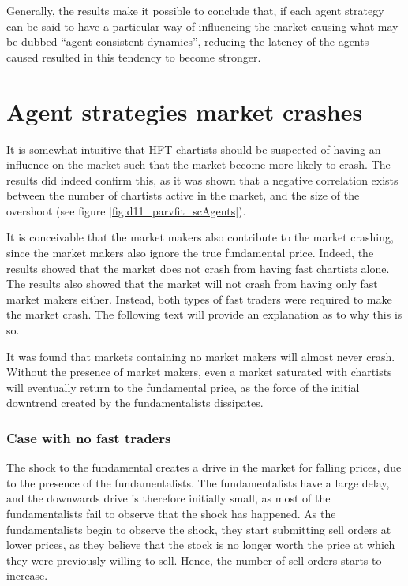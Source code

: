 Generally, the results make it possible to conclude that, if each agent strategy can be said to have a particular way of influencing the market causing what may be dubbed ``agent consistent dynamics'', reducing the latency of the agents caused  resulted in this tendency to become stronger.



\section{Agent strategies market crashes}


It is somewhat intuitive that HFT chartists should be suspected of having an influence on the market such that the market become more likely to crash. The results did indeed confirm this, as it was shown that a negative correlation exists between the number of chartists active in the market, and the size of the overshoot (see figure \ref{fig:d11_parvfit_scAgents}). 

It is conceivable that the market makers also contribute to the market crashing, since the market makers also ignore the true fundamental price. Indeed, the results showed that the market does not crash from having fast chartists alone. The results also showed that the market will not crash from having only fast market makers either. Instead, both types of fast traders were required to make the market crash. The following text will provide an explanation as to why this is so.

It was found that markets containing no market makers will almost never crash. Without the presence of market makers, even a market saturated with chartists will eventually return to the fundamental price, as the force of the initial downtrend created by the fundamentalists dissipates. 


\subsubsection*{Case with no fast traders}
The shock to the fundamental creates a drive in the market for falling prices, due to the presence of the fundamentalists. The fundamentalists have a large delay, and the downwards drive is therefore initially small, as most of the fundamentalists fail to observe that the shock has happened. As the fundamentalists begin to observe the shock, they start submitting sell orders at lower prices, as they believe that the stock is no longer worth the price at which they were previously willing to sell. Hence, the number of sell orders starts to increase. 


